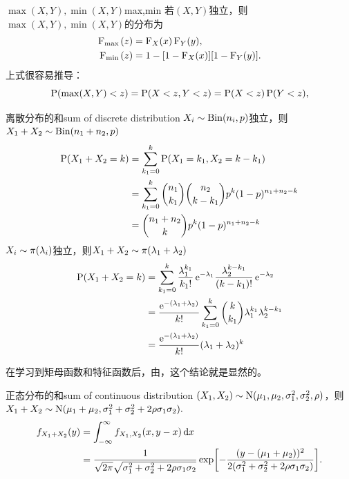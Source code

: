\begin{example}{$\max(X,Y),\min(X,Y)$}{max,min}
	若$(X,Y)$独立，则$\max(X,Y),\min(X,Y)$的分布为
	\begin{subequations}
		\label{eqn:min-max distribution}
		\begin{align}
			\CDF_{\max{}}(z) &= \CDF_X(x)\CDF_Y(y),\\
			\CDF_{\min{}}(z) &= 1 - [1 - \CDF_X(x)][1 - \CDF_Y(y)].
		\end{align}
	\end{subequations}
	上式很容易推导：
	\[
		\P(\max(X,Y) < z) = \P(X < z,Y < z) = \P(X < z)\P(Y < z),
	\]
\end{example}
\begin{example}{离散分布的和}{sum of discrete distribution}
	$X_i \sim \BinDist(n_i,p)$独立，则$X_1 + X_2 \sim \BinDist(n_1 + n_2,p)$
	\begin{align*}
		\P(X_1 + X_2 = k) &= \sum_{k_1=0}^k\P(X_1 = k_1,X_2 = k - k_1)\\
		&= \sum_{k_1=0}^k\binom{n_1}{k_1}\binom{n_2}{k - k_1}p^k(1 - p)^{n_1+n_2-k}\\
		&= \binom{n_1 + n_2}{k}p^k(1 - p)^{n_1+n_2-k}
	\end{align*}
	\tcblower
	$X_i \sim \PoisDist(\lambda_i)$独立，则$X_1 + X_2 \sim \PoisDist(\lambda_1 + \lambda_2)$
	\begin{align*}
		\P(X_1 + X_2 = k) &= \sum_{k_1=0}^k\frac{\lambda_1^{k_1}}{k_1!}\e^{-\lambda_1}\frac{\lambda_2^{k-k_1}}{(k - k_1)!}\e^{-\lambda_2}\\
		&= \frac{\e^{-(\lambda_1+\lambda_2)}}{k!}\sum_{k_1=0}^k\binom{k}{k_1}\lambda_1^{k_1}\lambda_2^{k-k_1}\\
		&= \frac{\e^{-(\lambda_1+\lambda_2)}}{k!}(\lambda_1 + \lambda_2)^k
	\end{align*}
\end{example}
\begin{remark}
	在学习到矩母函数和特征函数后，由，这个结论就是显然的。
\end{remark}
\begin{example}{正态分布的和}{sum of continuous distribution}
	$(X_1,X_2) \sim \NormalDist(\mu_1,\mu_2,\sigma_1^2,\sigma_2^2,\rho)$，则$X_1 + X_2 \sim \NormalDist(\mu_1 + \mu_2,\sigma_1^2 + \sigma_2^2 + 2\rho\sigma_1\sigma_2).$
	\begin{align*}
		f_{X_1+X_2}(y) &= \intR f_{X_1,X_2}(x,y - x)\d x\\
		&= \frac1{\sqrt{2\pi}\sqrt{\sigma_1^2 + \sigma_2^2 + 2\rho\sigma_1\sigma_2}}\exp\biggb{-\frac{(y - (\mu_1 + \mu_2))^2}{2(\sigma_1^2 + \sigma_2^2 + 2\rho\sigma_1\sigma_2)}}.
	\end{align*}
\end{example}
